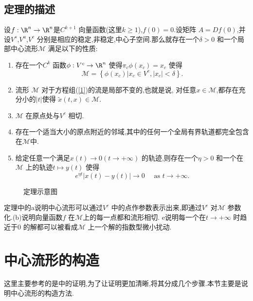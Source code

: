\subsection{定理的描述}
\begin{theorem}[中心流形定理]
  设$f:\R^{n}\to\R^{n}$是$C^{k+1}$ 向量函数(这里$k\ge 1$),$f(0)=0$.设矩阵 $A=Df(0)$,并设$V^{s}$,$V^{u}$,$V^{c}$ 分别是相应的稳定,非稳定,中心子空间.那么就存在一个$\delta>0$ 和一个局部中心流形$\mathcal{M}$ 满足以下的性质:
  \begin{enumerate}
    \item 存在一个$C^{k}$ 函数$\phi:V^{c}\to \R^{n}$ 使得$\pi_c\phi(x_c)=x_c$ 使得
      \begin{equation}
	\mathcal{M}=\left\{ \phi(x_c)\lvert x_c\in V^{c},\left| x_c \right| <\delta \right\} .
      \end{equation}
    \item 流形 $\mathcal{M}$ 对于方程组(\ref{1})的流是局部不变的,也就是说, 对任意$x\in \mathcal{M}$,都存在充分小的$\left| t \right| $使得 $\tilde{x}(t,x)\in \mathcal{M}$.
    \item $\mathcal{M}$ 在原点处与$V^{c}$ 相切.
    \item 存在一个适当大小的原点附近的邻域,其中的任何一个全局有界轨道都完全包含在$\mathcal{M}$中.
    \item 给定任意一个满足$x(t)\to 0\left( t\to +\infty \right) $ 的轨迹,则存在一个$\eta>0$ 和一个在$\mathcal{M}$ 上的轨迹$t\mapsto y(t)$ 使得
      \begin{equation}
	e^{\eta t}\left| x(t)-y(t) \right| \to 0\quad \text{ as } t\to +\infty.\label{25}
      \end{equation}
  \end{enumerate}
\end{theorem}
\begin{figure}[ht]
    \centering
    \caption{定理示意图}
    \label{fig:定理示意图}
\end{figure}
定理中的a说明中心流形可以通过$V^{c}$ 中的点作参数表示出来,即通过$V^{c}$ 对$\mathcal{M}$ 参数化.(b)说明向量函数$f$ 在$\mathcal{M}$上的每一点都和流形相切. e说明每一个在$t\to+\infty$ 时趋近于$0$ 的解都可以被看成$\mathcal{M}$ 上一个解的指数型微小扰动.

\section{中心流形的构造}
这里主要参考的是\cite{carr2006center}中的证明,为了让证明更加清晰,将其分成几个步骤.本节主要是说明中心流形的构造方法.
